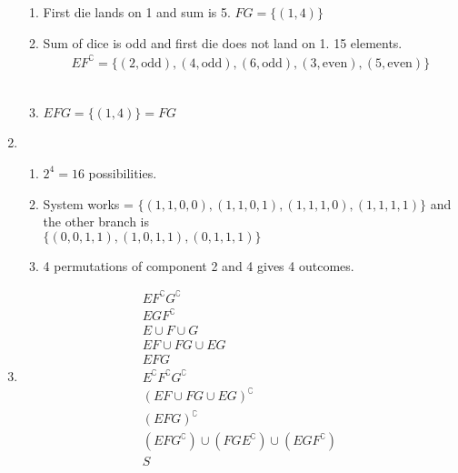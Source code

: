 \begin{enumerate}
\begin{enumerate}
		\item First die lands on 1 and sum is 5. $ FG = \{ (1,4) \} $ \\
		
		\item Sum of dice is odd and first die does not land on 1. 15 elements.
		\begin{align}
			E F^\complement = \{ (2, \text{odd}), (4, \text{odd}) , (6, \text{odd}), (3, \text{even}), (5, \text{even})\} 
		\end{align} \\
		
		\item $ EFG = \{ (1, 4) \} = FG $
	\end{enumerate} 
	
	\item \begin{enumerate}
		\item $ 2^4 = 16 $ possibilities. \\
		
		\item System works = $ \{ (1,1,0,0), (1,1,0,1), (1,1,1,0), (1,1,1,1)\} $ and the other branch is \\
		$ \{ (0,0,1,1), (1,0,1,1), (0,1,1,1) \} $ \\
		
		\item 4 permutations of component 2 and 4 gives 4 outcomes.
	\end{enumerate}
	
	\item \begin{subequations}
		\begin{align}
			E F^\complement G^\complement \\
			E G F^\complement \\
			E \cup F \cup G \\
			EF \cup FG \cup EG \\
			EFG \\
			E ^\complement F^\complement G^\complement \\
			(EF \cup FG \cup EG )^\complement \\
			( EFG )^\complement \\
			( EF G^\complement) \cup (FG E^\complement) \cup (EG F^\complement) \\
			S
		\end{align}
	\end{subequations}
	

\end{enumerate}
